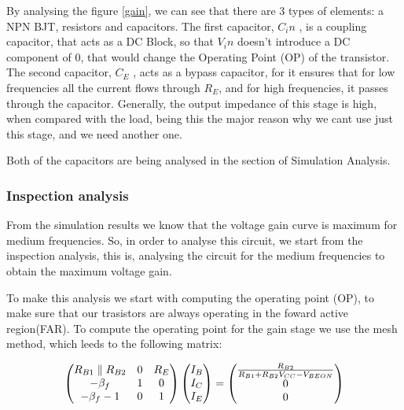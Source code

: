 By analysing the figure \ref{gain}, we can see that there are 3 types of elements: a NPN BJT, resistors and capacitors.
The first capacitor, $C_in$ , is a coupling capacitor, that acts as a DC Block, so that $V_in$ doesn’t
introduce a DC component of 0, that would change the Operating Point (OP) of the transistor.
The second capacitor, $C _E$ , acts as a bypass capacitor, for it ensures that for low frequencies
all the current flows through $R_E$, and for high frequencies, it passes through the capacitor.
Generally, the output impedance of this stage is high, when compared with the load,
being this the major reason why we cant use just this stage, and we need another one. \par
Both of the capacitors are being analysed in the section of Simulation Analysis.




\subsubsection{Inspection analysis}

From the simulation results we know that the voltage gain curve is maximum for medium frequencies. So, in order to analyse this circuit, we start from the inspection analysis, this is, analysing the circuit for the medium frequencies to obtain the maximum voltage gain. 

To make this analysis we start with computing the operating point (OP), to make sure that our trasistors are always operating in the foward active region(FAR). To compute the operating point for the gain stage we use the mesh method, which leeds to the following matrix:

\begin{equation}
\begin{pmatrix}
R_{B1} \parallel R_{B2} & 0 & R_E \\
-\beta_f & 1 & 0 \\
-\beta_f - 1 & 0 & 1 \\ 
\end{pmatrix}
\begin{pmatrix}
I_B\\
I_C\\
I_E
\end{pmatrix}
=
\begin{pmatrix}
\frac{R_{B2}}{R_{B1} + R_{B2}V_{CC} - V_{BEON}}\\
0\\
0
\end{pmatrix}
\centering
\end{equation}

